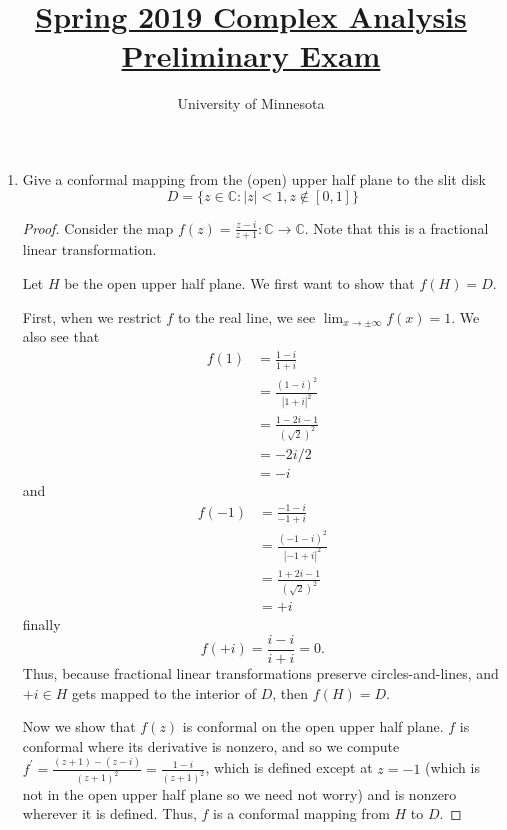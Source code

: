 \documentclass{article}
\title{\href{https://math.umn.edu/sites/math.umn.edu/files/exams/complexs19.pdf}{Spring 2019 Complex Analysis Preliminary Exam}}
\author{University of Minnesota}
\date{}
\begin{document}
\maketitle


\begin{enumerate}
	\item Give a conformal mapping from the (open) upper half plane to the slit disk \[ D = \{ z \in \mathbb{C} : |z| < 1, z \not \in [0,1] \}\]
	
	\begin{proof}
		Consider the map $f(z) = \frac{z-i}{z+1}: \mathbb{C} \rightarrow \mathbb{C}$. Note that this is a fractional linear transformation.
		
		Let $H$ be the open upper half plane.
		We first want to show that $f(H) = D$.
		
		First, when we restrict $f$ to the real line, we see $\lim_{x \rightarrow \pm \infty} f(x) = 1$. We also see that 
		\begin{align*}
			f(1) &= \frac{1-i}{1+i}\\
				&= \frac{(1-i)^2}{ | 1+i|^2}\\
				&= \frac{1-2i-1}{ (\sqrt{2})^2}\\
				&= -2i/2 \\
				&= -i
		\end{align*}
		and
		\begin{align*}
			f(-1) &= \frac{-1-i}{-1+i}\\
				&= \frac{(-1-i)^2}{|-1+i|^2}\\
				&= \frac{1 + 2i - 1}{ (\sqrt{2})^2 }\\
				&= +i
		\end{align*}
		finally
		\[f(+i) = \frac{i - i }{i+i} = 0.\]
		Thus, because fractional linear transformations preserve circles-and-lines, and $+i \in H$ gets mapped to the interior of $D$, then $f(H) = D$.

		Now we show that $f(z)$ is conformal on the open upper half plane. $f$ is conformal where its derivative is nonzero, and so we compute
		$f^\prime = \frac{(z+1)- (z-i)}{(z+1)^2} = \frac{1-i}{(z+1)^2}$, which is defined except at $z=-1$ (which is not in the open upper half plane so we need not worry) and is nonzero wherever it is defined.
		Thus, $f$ is a conformal mapping from $H$ to $D$.
		 

\end{proof}
\end{enumerate}
\end{document}
